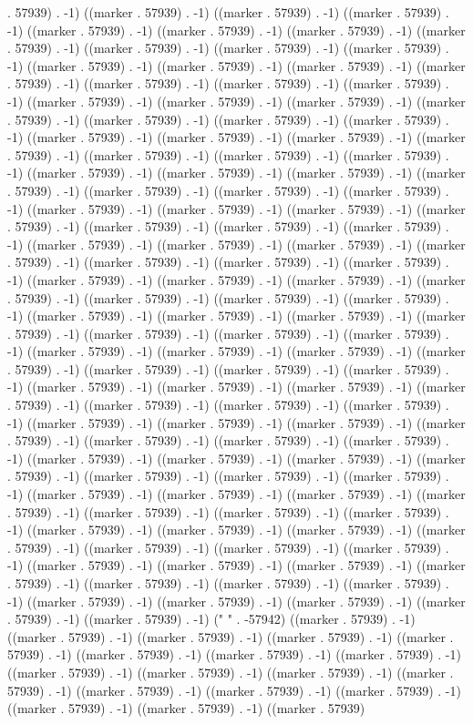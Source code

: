 . 57939) . -1) ((marker . 57939) . -1) ((marker . 57939) . -1) ((marker . 57939) . -1) ((marker . 57939) . -1) ((marker . 57939) . -1) ((marker . 57939) . -1) ((marker . 57939) . -1) ((marker . 57939) . -1) ((marker . 57939) . -1) ((marker . 57939) . -1) ((marker . 57939) . -1) ((marker . 57939) . -1) ((marker . 57939) . -1) ((marker . 57939) . -1) ((marker . 57939) . -1) ((marker . 57939) . -1) ((marker . 57939) . -1) ((marker . 57939) . -1) ((marker . 57939) . -1) ((marker . 57939) . -1) ((marker . 57939) . -1) ((marker . 57939) . -1) ((marker . 57939) . -1) ((marker . 57939) . -1) ((marker . 57939) . -1) ((marker . 57939) . -1) ((marker . 57939) . -1) ((marker . 57939) . -1) ((marker . 57939) . -1) ((marker . 57939) . -1) ((marker . 57939) . -1) ((marker . 57939) . -1) ((marker . 57939) . -1) ((marker . 57939) . -1) ((marker . 57939) . -1) ((marker . 57939) . -1) ((marker . 57939) . -1) ((marker . 57939) . -1) ((marker . 57939) . -1) ((marker . 57939) . -1) ((marker . 57939) . -1) ((marker . 57939) . -1) ((marker . 57939) . -1) ((marker . 57939) . -1) ((marker . 57939) . -1) ((marker . 57939) . -1) ((marker . 57939) . -1) ((marker . 57939) . -1) ((marker . 57939) . -1) ((marker . 57939) . -1) ((marker . 57939) . -1) ((marker . 57939) . -1) ((marker . 57939) . -1) ((marker . 57939) . -1) ((marker . 57939) . -1) ((marker . 57939) . -1) ((marker . 57939) . -1) ((marker . 57939) . -1) ((marker . 57939) . -1) ((marker . 57939) . -1) ((marker . 57939) . -1) ((marker . 57939) . -1) ((marker . 57939) . -1) ((marker . 57939) . -1) ((marker . 57939) . -1) ((marker . 57939) . -1) ((marker . 57939) . -1) ((marker . 57939) . -1) ((marker . 57939) . -1) ((marker . 57939) . -1) ((marker . 57939) . -1) ((marker . 57939) . -1) ((marker . 57939) . -1) ((marker . 57939) . -1) ((marker . 57939) . -1) ((marker . 57939) . -1) ((marker . 57939) . -1) ((marker . 57939) . -1) ((marker . 57939) . -1) ((marker . 57939) . -1) ((marker . 57939) . -1) ((marker . 57939) . -1) ((marker . 57939) . -1) ((marker . 57939) . -1) ((marker . 57939) . -1) ((marker . 57939) . -1) ((marker . 57939) . -1) ((marker . 57939) . -1) ((marker . 57939) . -1) ((marker . 57939) . -1) ((marker . 57939) . -1) ((marker . 57939) . -1) ((marker . 57939) . -1) ((marker . 57939) . -1) ((marker . 57939) . -1) ((marker . 57939) . -1) ((marker . 57939) . -1) ((marker . 57939) . -1) ((marker . 57939) . -1) ((marker . 57939) . -1) ((marker . 57939) . -1) ((marker . 57939) . -1) ((marker . 57939) . -1) ((marker . 57939) . -1) ((marker . 57939) . -1) ((marker . 57939) . -1) ((marker . 57939) . -1) ((marker . 57939) . -1) ((marker . 57939) . -1) ((marker . 57939) . -1) ((marker . 57939) . -1) ((marker . 57939) . -1) ((marker . 57939) . -1) ((marker . 57939) . -1) ((marker . 57939) . -1) ((marker . 57939) . -1) ((marker . 57939) . -1) ((marker . 57939) . -1) ((marker . 57939) . -1) ((marker . 57939) . -1) (" " . -57942) ((marker . 57939) . -1) ((marker . 57939) . -1) ((marker . 57939) . -1) ((marker . 57939) . -1) ((marker . 57939) . -1) ((marker . 57939) . -1) ((marker . 57939) . -1) ((marker . 57939) . -1) ((marker . 57939) . -1) ((marker . 57939) . -1) ((marker . 57939) . -1) ((marker . 57939) . -1) ((marker . 57939) . -1) ((marker . 57939) . -1) ((marker . 57939) . -1) ((marker . 57939) . -1) ((marker . 57939) . -1) ((marker . 57939) 